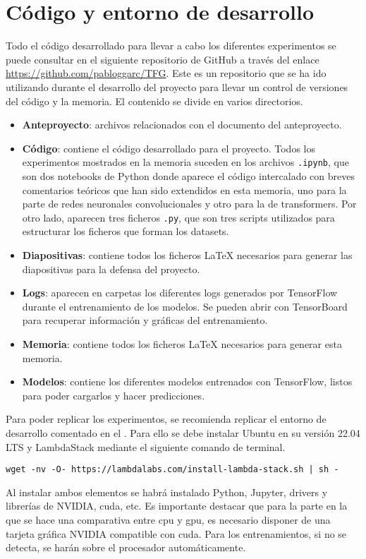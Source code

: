 \chapter{Código y entorno de desarrollo}

	Todo el código desarrollado para llevar a cabo los diferentes experimentos se puede consultar en el siguiente repositorio de GitHub a través del enlace \url{https://github.com/pabloggarc/TFG}. Este es un repositorio que se ha ido utilizando durante el desarrollo del proyecto para llevar un control de versiones del código y la memoria. El contenido se divide en varios directorios. 
	
	\begin{itemize}
		\item \textbf{Anteproyecto}: archivos relacionados con el documento del anteproyecto. 
		\item \textbf{Código}: contiene el código desarrollado para el proyecto. Todos los experimentos mostrados en la memoria suceden en los archivos \texttt{.ipynb}, que son dos notebooks de Python donde aparece el código intercalado con breves comentarios teóricos que han sido extendidos en esta memoria, uno para la parte de redes neuronales convolucionales y otro para la de transformers. Por otro lado, aparecen tres ficheros \texttt{.py}, que son tres scripts utilizados para estructurar los ficheros que forman los datasets. 
		\item \textbf{Diapositivas}: contiene todos los ficheros \LaTeX{} necesarios para generar las diapositivas para la defensa del proyecto. 
		\item \textbf{Logs}: aparecen en carpetas los diferentes logs generados por TensorFlow durante el entrenamiento de los modelos. Se pueden abrir con TensorBoard para recuperar información y gráficas del entrenamiento. 
		\item \textbf{Memoria}: contiene todos los ficheros \LaTeX{} necesarios para generar esta memoria. 
		\item \textbf{Modelos}: contiene los diferentes modelos entrenados con TensorFlow, listos para poder cargarlos y hacer predicciones. 
	\end{itemize}
	
	Para poder replicar los experimentos, se recomienda replicar el entorno de desarrollo comentado en el . Para ello se debe instalar Ubuntu en su versión 22.04 LTS y LambdaStack mediante el siguiente comando de terminal. 
	\begin{center}
		\begin{BVerbatim}[tabsize = 0]
			wget -nv -O- https://lambdalabs.com/install-lambda-stack.sh | sh -
		\end{BVerbatim}
	\end{center}
	Al instalar ambos elementos se habrá instalado Python, Jupyter, drivers y librerías de NVIDIA, \gls{cuda}, etc. Es importante destacar que para la parte en la que se hace una comparativa entre \gls{cpu} y \gls{gpu}, es necesario disponer de una tarjeta gráfica NVIDIA compatible con \gls{cuda}. Para los entrenamientos, si no se detecta, se harán sobre el procesador automáticamente. \\
	
